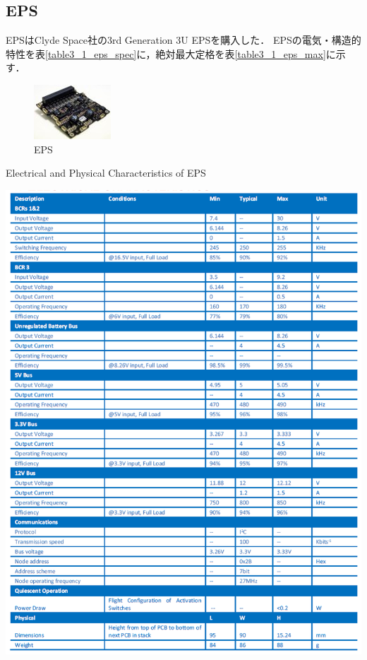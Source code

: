 \subsection{EPS}
EPSはClyde Space社の3rd Generation 3U EPSを購入した．
EPSの電気・構造的特性を表\ref{table3_1_eps_spec}に，絶対最大定格を表\ref{table3_1_eps_max}に示す．
\begin{figure}[htbp]
	\begin{center}
		\includegraphics[width=0.5\linewidth]{./03/fig/eps.jpg}
		\caption{EPS}
		\label{eps}
	\end{center}
\end{figure}


\begin{table}[htbp]
	\centering
	\caption{Electrical and Physical Characteristics of EPS \cite{eps_um}}
	\includegraphics[width=0.9\linewidth]{./03/fig/eps_spec.png}
	\label{table3_1_eps_spec}
\end{table}

